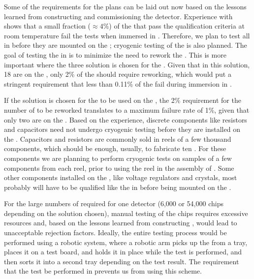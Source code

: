 Some of the requirements for the  plans can
be laid out now based on the lessons learned
from constructing and commissioning the 
detector. Experience with  shows that a small fraction
($\approx4$\%) of the   that pass the
qualification criteria at room temperature fail the tests
when immersed in \lntwo. Therefore, we plan to test all  in \lntwo
before they are mounted on the ; 
cryogenic testing of the  is also planned. The goal of testing 
the  in \lntwo is to minimize the need
to rework the . This is more important where the three  solution is chosen for the
. Given that in this solution, 18  are on the
, only 2\% of the  should
require reworking, which would put a stringent requirement that less than
0.11\% of the  fail during immersion in \lntwo.

If the  solution is chosen for the 
to be used on the , the 2\% requirement for the
number of  to be reworked translates to a 
maximum failure rate of 1\%, given that only two
 are on the . Based on the 
experience, discrete components like resistors and capacitors
need not undergo cryogenic testing before they are installed
on the . Capacitors and resistors are commonly
sold in reels of a few thousand components, which
should be enough, usually, to fabricate ten
. For these components we are planning to
perform cryogenic tests on samples of a few components
from each reel, prior to using the reel in the assembly of
. Some other components installed on
the , like voltage regulators and crystals, most probably will have to be qualified like the 
in \lntwo before being mounted on the .

For the large numbers of
 required for one   detector
(6,000 or 54,000 chips depending on the  solution
chosen), manual testing of the chips requires excessive 
resources and, based on the lessons learned from  
constructing  , would lead to unacceptable rejection
factors. Ideally, the entire testing
process would be performed using a robotic system, where 
a robotic arm picks up the  from a tray, places
it on a test board, and holds it in place while the test
is performed, and then sorts it into a second tray
depending on the test result. The requirement that the test
be performed in \lntwo prevents us from using this
scheme. 

